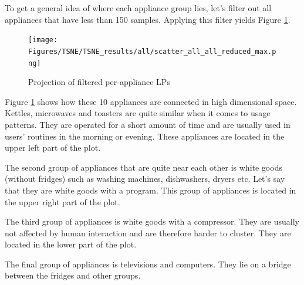 
To get a general idea of where each appliance group lies,
let's filter out all appliances that have less than 150 samples.
Applying this filter yields Figure \ref{fig:tsne_papb_scatter_all_reduced}.

\begin{figure}[H]
	\centering
	\caption{Projection of filtered per-appliance LPs}
	\texttt{[image: Figures/TSNE/TSNE\_results/all/scatter\_all\_all\_reduced\_max.png]}
	\label{fig:tsne_papb_scatter_all_reduced}
\end{figure}

Figure \ref{fig:tsne_papb_scatter_all_reduced} shows how these 10 appliances are connected in high dimensional space.
Kettles, microwaves and toasters are quite similar when it comes to usage patterns.
They are operated for a short amount of time and are usually used in users' routines in the morning or evening.
These appliances are located in the upper left part of the plot.

The second group of appliances that are quite near each other is white
goods (without fridges) such as washing machines, dishwashers, dryers etc.
Let's say that they are white goods with a program. 
This group of appliances is located in the upper right part of the plot.

The third group of appliances is white goods with a compressor.
They are usually not affected by human interaction and are therefore harder to cluster.
They are located in the lower part of the plot.

The final group of appliances is televisions and computers. They lie 
on a bridge between the fridges and other groups. 



